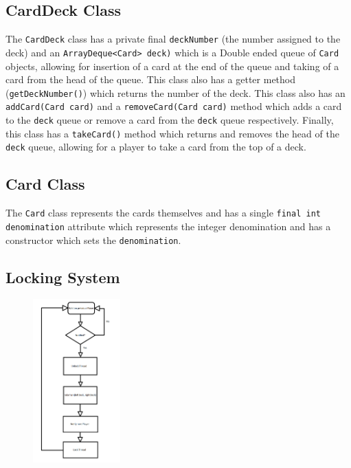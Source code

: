 \documentclass[a4paper, 11pt] {article}
\begin{document}
\subsection*{CardDeck Class}
The \texttt{CardDeck} class has a private final \texttt{deckNumber} (the number assigned to the deck) and an \texttt{ArrayDeque<Card> deck)} which is a Double ended queue of \texttt{Card} objects, allowing for insertion of a card at the end of the queue and taking of a card from the head of the queue. This class also has a getter method (\texttt{getDeckNumber()}) which returns the number of the deck. This class also has an \texttt{addCard(Card card)} and a \texttt{removeCard(Card card)} method which adds a card to the \texttt{deck} queue or remove a card from the \texttt{deck} queue respectively. Finally, this class has a \texttt{takeCard()} method which returns and removes the head of the \texttt{deck} queue, allowing for a player to take a card from the top of a deck.

\subsection*{Card Class}
The \texttt{Card} class represents the cards themselves and has a single \texttt{final int denomination} attribute which represents the integer denomination and has a constructor which sets the \texttt{denomination}.

\subsection*{Locking System}
\begin{figure}
\centering
\includegraphics[width=0.3\textwidth]{thread_locking.png}
\end{figure}
\end{document}

